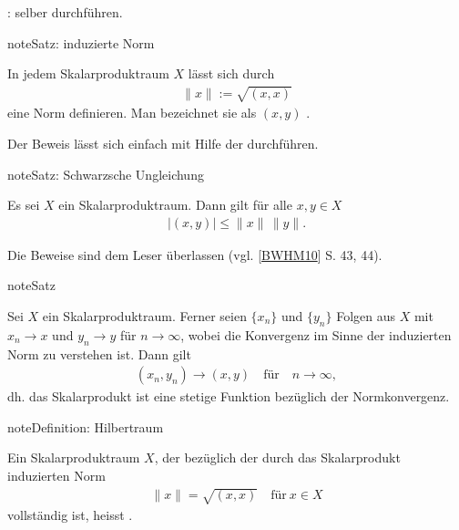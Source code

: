 \documentclass[letterpaper,10pt,english]{jupyterBook}
\begin{document}
: selber durchführen.

\begin{sphinxadmonition}{note}{Satz: induzierte Norm}

In jedem Skalarproduktraum \(X\) lässt sich durch
\begin{equation*}
\begin{split}\|x\| := \sqrt{(x,x)}\end{split}
\end{equation*}
eine Norm definieren. Man bezeichnet sie als  \((x,y)\) .
\end{sphinxadmonition}

Der Beweis lässt sich einfach mit Hilfe der  durchführen.

\begin{sphinxadmonition}{note}{Satz: Schwarzsche Ungleichung}

Es sei \(X\) ein Skalarproduktraum. Dann gilt für alle \(x,y\in X\)
\begin{equation*}
\begin{split}|(x,y)| \le \|x\|\,\|y\|.\end{split}
\end{equation*}\end{sphinxadmonition}

Die Beweise sind dem Leser überlassen (vgl. {[}\hyperlink{cite.Appendix:id2}{BWHM10}{]} S. 43, 44).

\begin{sphinxadmonition}{note}{Satz}

Sei \(X\) ein Skalarproduktraum. Ferner seien \(\{x_n\}\) und \(\{y_n\}\) Folgen aus \(X\) mit \(x_n \to x\) und \(y_n \to y\) für \(n\to\infty\), wobei die Konvergenz im Sinne der induzierten Norm zu verstehen ist. Dann gilt
\begin{equation*}
\begin{split}(x_n, y_n) \to (x,y)\quad\text{für}\quad n\to\infty,\end{split}
\end{equation*}
dh. das Skalarprodukt ist eine stetige Funktion bezüglich der Normkonvergenz.
\end{sphinxadmonition}

\begin{sphinxadmonition}{note}{Definition: Hilbertraum}

Ein Skalarproduktraum \(X\), der bezüglich der durch das Skalarprodukt induzierten Norm
\begin{equation*}
\begin{split}\|x\| = \sqrt{(x,x)}\quad\text{für}\ x\in X\end{split}
\end{equation*}
vollständig ist, heisst .
\end{sphinxadmonition}
\end{document}

